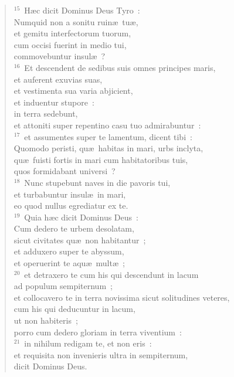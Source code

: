 \begin{flushleft}
\begin{verse}
${}^{15}$~H\ae c dicit Dominus Deus Tyro~:\\ Numquid non a sonitu ruin\ae\ tu\ae ,\\ et gemitu interfectorum tuorum,\\ cum occisi fuerint in medio tui,\\ commovebuntur insul\ae~?\\
${}^{16}$~Et descendent de sedibus suis omnes principes maris,\\ et auferent exuvias suas,\\ et vestimenta sua varia abjicient,\\ et induentur stupore~:\\ in terra sedebunt,\\ et attoniti super repentino casu tuo admirabuntur~:\\
${}^{17}$~et assumentes super te lamentum, dicent tibi~:\\ Quomodo peristi, qu\ae\ habitas in mari, urbs inclyta,\\ qu\ae\ fuisti fortis in mari cum habitatoribus tuis,\\ quos formidabant universi~?\\
${}^{18}$~Nunc stupebunt naves in die pavoris tui,\\ et turbabuntur insul\ae\ in mari,\\ eo quod nullus egrediatur ex te.\\
${}^{19}$~Quia h\ae c dicit Dominus Deus~:\\ Cum dedero te urbem desolatam,\\ sicut civitates qu\ae\ non habitantur~;\\ et adduxero super te abyssum,\\ et operuerint te aqu\ae\ mult\ae~;\\
${}^{20}$~et detraxero te cum his qui descendunt in lacum\\ ad populum sempiternum~;\\ et collocavero te in terra novissima sicut solitudines veteres,\\ cum his qui deducuntur in lacum,\\ ut non habiteris~;\\ porro cum dedero gloriam in terra viventium~:\\
${}^{21}$~in nihilum redigam te, et non eris~:\\ et requisita non invenieris ultra in sempiternum,\\ dicit Dominus Deus.\end{verse}\end{flushleft}


